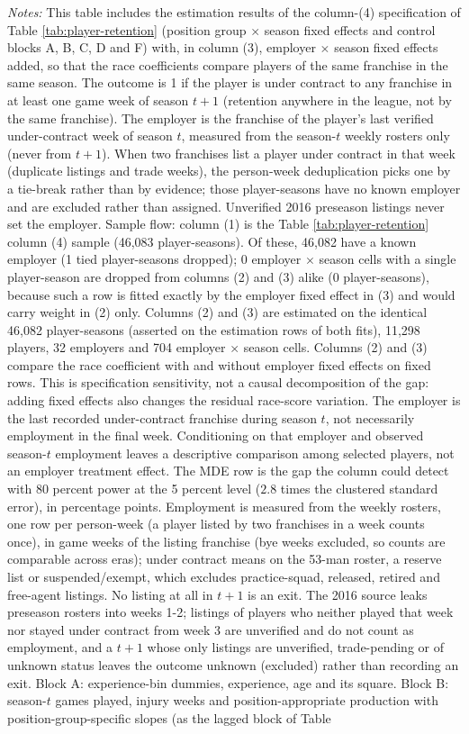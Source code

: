 {\footnotesize
\noindent\textit{Notes:} This table includes the estimation results of the column-(4) specification of Table \ref{tab:player-retention} (position group $\times$ season fixed effects and control blocks A, B, C, D and F) with, in column (3), employer $\times$ season fixed effects added, so that the race coefficients compare players of the same franchise in the same season. The outcome is 1 if the player is under contract to any franchise in at least one game week of season $t+1$ (retention anywhere in the league, not by the same franchise). The employer is the franchise of the player's last verified under-contract week of season $t$, measured from the season-$t$ weekly rosters only (never from $t+1$). When two franchises list a player under contract in that week (duplicate listings and trade weeks), the person-week deduplication picks one by a tie-break rather than by evidence; those player-seasons have no known employer and are excluded rather than assigned. Unverified 2016 preseason listings never set the employer. Sample flow: column (1) is the Table \ref{tab:player-retention} column (4) sample (46,083 player-seasons). Of these, 46,082 have a known employer (1 tied player-seasons dropped); 0 employer $\times$ season cells with a single player-season are dropped from columns (2) and (3) alike (0 player-seasons), because such a row is fitted exactly by the employer fixed effect in (3) and would carry weight in (2) only. Columns (2) and (3) are estimated on the identical 46,082 player-seasons (asserted on the estimation rows of both fits), 11,298 players, 32 employers and 704 employer $\times$ season cells. Columns (2) and (3) compare the race coefficient with and without employer fixed effects on fixed rows. This is specification sensitivity, not a causal decomposition of the gap: adding fixed effects also changes the residual race-score variation. The employer is the last recorded under-contract franchise during season $t$, not necessarily employment in the final week. Conditioning on that employer and observed season-$t$ employment leaves a descriptive comparison among selected players, not an employer treatment effect. The MDE row is the gap the column could detect with 80 percent power at the 5 percent level ($2.8$ times the clustered standard error), in percentage points. Employment is measured from the weekly rosters, one row per person-week (a player listed by two franchises in a week counts once), in game weeks of the listing franchise (bye weeks excluded, so counts are comparable across eras); under contract means on the 53-man roster, a reserve list or suspended/exempt, which excludes practice-squad, released, retired and free-agent listings. No listing at all in $t+1$ is an exit. The 2016 source leaks preseason rosters into weeks 1-2; listings of players who neither played that week nor stayed under contract from week 3 are unverified and do not count as employment, and a $t+1$ whose only listings are unverified, trade-pending or of unknown status leaves the outcome unknown (excluded) rather than recording an exit. Block A: experience-bin dummies, experience, age and its square. Block B: season-$t$ games played, injury weeks and position-appropriate production with position-group-specific slopes (as the lagged block of Table }
